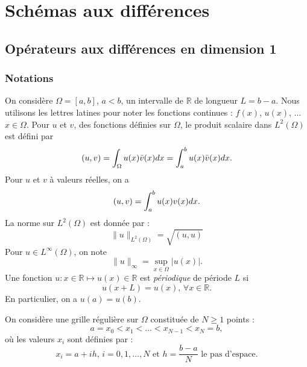 \chapter{Schémas aux différences}

\section{Opérateurs aux différences en dimension 1}

\subsection{Notations}
\label{sec:notation_1D}

On considère $\Omega = [a,b]$, $a<b$, un intervalle de $\mathbb{R}$ de longueur $L=b-a$. Nous utilisons les lettres latines pour noter les fonctions continues : $f(x)$, $u(x)$, ... $x \in \Omega$. Pour $u$ et $v$, des fonctions définies sur $\Omega$, le produit scalaire dans $L^2 ( \Omega )$ est défini par
\begin{equation}
(u,v) = \displaystyle\int_{\Omega} u(x) \bar{v}(x) dx = \displaystyle\int_{a}^b u(x) \bar{v}(x) dx.
\end{equation}
Pour $u$ et $v$ à valeurs réelles, on a
\begin{equation}
(u,v) = \displaystyle\int_{a}^b u(x) v(x) dx.
\end{equation}
La norme sur $L^2(\Omega)$ est donnée par :
\begin{equation}
\| u \|_{L^2(\Omega)} = \sqrt{(u,u)}
\end{equation}
Pour $u \in L^{\infty}(\Omega)$, on note
\begin{equation}
\| u \|_{\infty} = \sup_{x\in\Omega} |u(x)|.
\end{equation}
Une fonction $u : x \in \mathbb{R} \mapsto u(x) \in \mathbb{R}$ est \textit{périodique} de période $L$ si 
\begin{equation}
u(x+L) = u(x) \text{, } \forall x \in \mathbb{R}.
\end{equation}
En particulier, on a $u(a)=u(b)$.

On considère une grille régulière sur $\Omega$ constituée de $N \geq 1$ points :
\begin{equation}
a=x_0 < x_1 < \ldots < x_{N-1} < x_N = b,
\end{equation}
où les valeurs $x_i$ sont définies par :
\begin{equation}
x_i = a + ih\text{, } i = 0,1, \ldots,N \text{ et } h = \dfrac{b-a}{N} \text{ le pas d'espace}. 
\end{equation}

